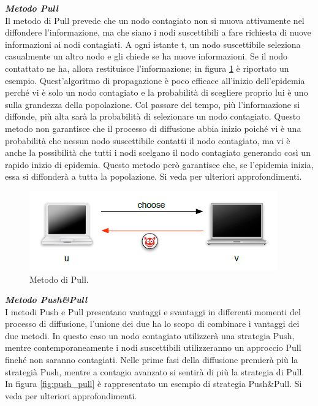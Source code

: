 \noindent\textbf{\textit{Metodo Pull}}\\
Il metodo di Pull prevede che un nodo contagiato non si muova attivamente nel diffondere l'informazione, ma che siano i nodi suscettibili a fare richiesta di nuove informazioni ai nodi contagiati. A ogni istante t, un nodo suscettibile seleziona casualmente un altro nodo e gli chiede se ha nuove informazioni. Se il nodo contattato ne ha, allora restituisce l'informazione; in figura \ref{fig:pull} è riportato un esempio. Quest'algoritmo di propagazione è poco efficace all'inizio dell'epidemia perché vi è solo un nodo contagiato e la probabilità di scegliere proprio lui è uno sulla grandezza della popolazione. Col passare del tempo, più l'informazione si diffonde, più alta sarà la probabilità di selezionare un nodo contagiato. Questo metodo non garantisce che il processo di diffusione abbia inizio poiché vi è una probabilità che nessun nodo suscettibile contatti il nodo contagiato, ma vi è anche la possibilità che tutti i nodi scelgano il nodo contagiato generando così un rapido inizio di epidemia. Questo metodo però garantisce che, se l'epidemia inizia, essa si diffonderà a tutta la popolazione. Si veda \cite{schindel2004-epidemicAlg} per ulteriori approfondimenti.

\begin{figure}[h]
	\centering
	\includegraphics[width=0.6\linewidth,keepaspectratio]{Images/algoritmi_gossip/pull}
	\caption[Metodo di Pull]{Metodo di Pull\cite{schindel2004-epidemicAlg}.}
	\label{fig:pull}
\end{figure}

\noindent\textbf{\textit{Metodo Push\&Pull}}\\
I metodi Push e Pull presentano vantaggi e svantaggi in differenti momenti del processo di diffusione, l'unione dei due ha lo scopo di combinare i vantaggi dei due metodi. In questo caso un nodo contagiato utilizzerà una strategia Push, mentre contemporaneamente i nodi suscettibili utilizzeranno un approccio Pull finché non saranno contagiati. Nelle prime fasi della diffusione premierà più la strategià Push, mentre a contagio avanzato si sentirà di più la strategia di Pull. In figura \ref{fig:push_pull} è rappresentato un esempio di strategia Push\&Pull. Si veda \cite{schindel2004-epidemicAlg} per ulteriori approfondimenti.

